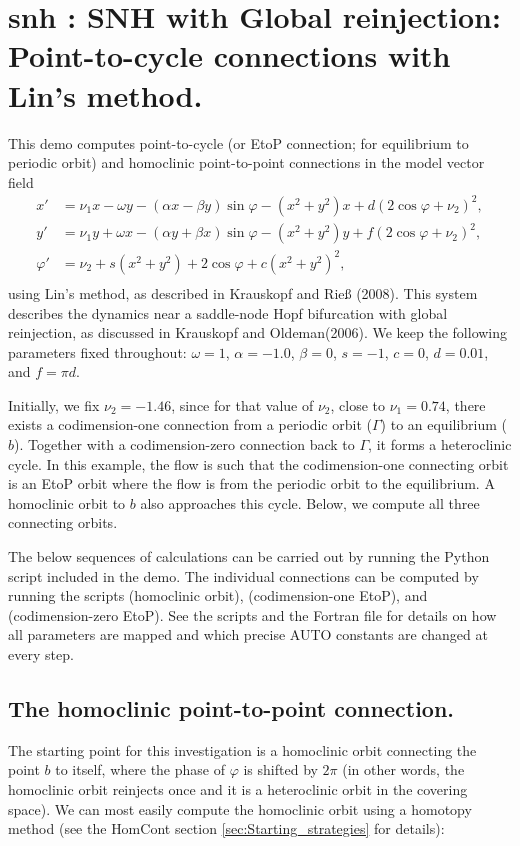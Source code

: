 \documentclass[12pt]{report}
\begin{document}
\section{ snh : SNH with Global reinjection: Point-to-cycle connections with Lin's method.} \label{sec:Demos_snh}
This demo computes point-to-cycle
(or EtoP connection; for equilibrium to periodic orbit)
and homoclinic point-to-point connections in the model vector field
\begin{equation} \begin{array}{cl}
  x' &=  \nu_1 x - \omega y - (\alpha x - \beta y) \sin \varphi -
  (x^2+y^2)x + d (2 \cos \varphi+\nu_2)^2, \\
  y' &=  \nu_1 y + \omega x - (\alpha y + \beta x) \sin \varphi -
  (x^2+y^2) y + f (2 \cos \varphi+\nu_2)^2,  \\
  \varphi' &=  \nu_2 + s (x^2+y^2) + 2 \cos \varphi + c(x^2+y^2)^2,
  \\ \end{array} \end{equation}
using Lin's method, as described in Krauskopf and Rie\ss
(2008). %
This system describes the dynamics near a saddle-node Hopf bifurcation
with global reinjection, as discussed in Krauskopf and Oldeman(2006).
We keep the following parameters fixed throughout: $\omega=1$,
$\alpha=-1.0$, $\beta=0$, $s=-1$, $c=0$, $d=0.01$, and $f=\pi d$.

Initially, we fix $\nu_2=-1.46$, since
for that value of $\nu_2$, close to $\nu_1=0.74$,
there exists a codimension-one connection from a periodic orbit
($\Gamma$) to an equilibrium ($b$). Together with a codimension-zero connection
back to $\Gamma$, it forms a heteroclinic cycle. In this example, the
flow is such that the codimension-one connecting orbit is an EtoP
orbit where the flow is from the periodic orbit to the equilibrium.
A homoclinic orbit
to $b$ also approaches this cycle. Below, we compute all three
connecting orbits.

The below sequences of calculations can be carried out by
running the Python script  included in the demo.
The individual connections can be computed by running the scripts
 (homoclinic orbit),  (codimension-one
EtoP), and  (codimension-zero EtoP).
See the scripts and the Fortran file  for details on
how all parameters are mapped and which precise AUTO constants
are changed at every step.

\subsection{The homoclinic point-to-point connection.}
The starting point for this investigation is a homoclinic orbit
connecting the point $b$ to itself, where the phase of $\varphi$ is
shifted by $2\pi$ (in other words, the homoclinic orbit reinjects
once and it is a heteroclinic orbit in the covering space).
We can most easily compute the homoclinic orbit using a 
homotopy method
(see the {\cal HomCont} section \ref{sec:Starting_strategies} for details):
\end{document}
